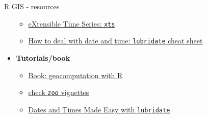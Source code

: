 \documentclass[9pt,ignorenonframetext,]{beamer}
\providecommand{\tightlist}{%
  \setlength{\itemsep}{0pt}\setlength{\parskip}{0pt}}
\begin{document}
\begin{frame}[fragile]{R GIS - resources}
\begin{itemize}
  \begin{itemize}
  \tightlist
  \item
    \href{https://s3.amazonaws.com/assets.datacamp.com/blog_assets/xts_Cheat_Sheet_R.pdf}{eXtensible
    Time Series: \texttt{xts}}
  \item
    \href{https://github.com/rstudio/cheatsheets/raw/master/lubridate.pdf}{How
    to deal with date and time: \texttt{lubridate} cheat sheet}
  \end{itemize}
\item
  \textbf{Tutorials/book}

  \begin{itemize}
  \tightlist
  \item
    \href{https://bookdown.org/robinlovelace/geocompr}{Book:
    geocomputation with R}
  \item
    \href{https://cran.r-project.org/web/packages/zoo/index.html}{check
    \texttt{zoo} vignettes}
  \item
    \href{http://vita.had.co.nz/papers/lubridate.pdf}{Dates and Times
    Made Easy with \texttt{lubridate}}
  \end{itemize}
\end{itemize}

\end{frame}
\end{document}

